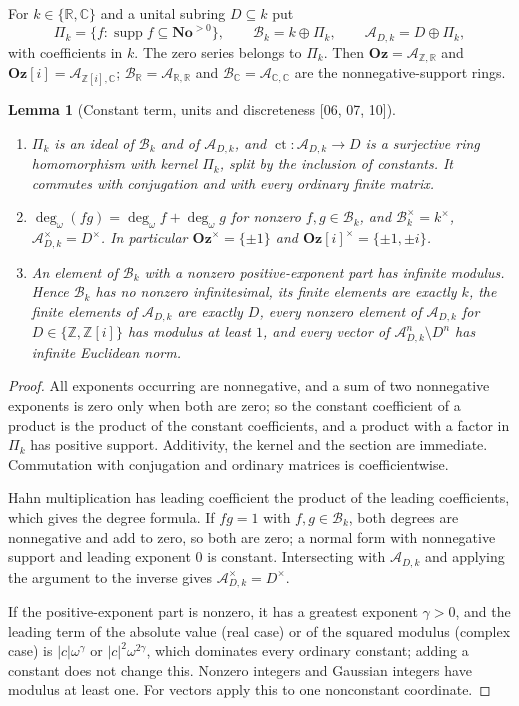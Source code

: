 \documentclass[11pt,oneside]{article}
\numberwithin{equation}{section}
\newtheorem{lemma}[lemma]{Lemma}
\theoremstyle{definition}
\theoremstyle{remark}
\newcommand{\No}{\mathbf{No}}
\newcommand{\Oz}{\mathbf{Oz}}
\newcommand{\GOz}{\mathbf{Oz}[i]}
\newcommand{\Z}{\mathbb Z}
\newcommand{\R}{\mathbb R}
\newcommand{\C}{\mathbb C}
\newcommand{\A}{\mathcal A}
\newcommand{\Bk}{\mathcal B_k}
\newcommand{\BR}{\mathcal B_{\R}}
\newcommand{\BC}{\mathcal B_{\C}}
\newcommand{\ct}{\operatorname{ct}}
\newcommand{\supp}{\operatorname{supp}}
\newcommand{\ddeg}{\operatorname{deg}_{\omega}}
\newcommand{\src}[1]{\textup{\textsf{\small[#1]}}}
\begin{document}
For $k\in\{\R,\C\}$ and a unital subring $D\subseteq k$ put
\begin{equation}\label{ogl:eq:rings}
 \Pi_k=\{f:\supp f\subseteq\No^{>0}\},\qquad
 \Bk=k\oplus\Pi_k,\qquad
 \A_{D,k}=D\oplus\Pi_k,
\end{equation}
with coefficients in $k$. The zero series belongs to $\Pi_k$. Then
$\Oz=\A_{\Z,\R}$ and $\GOz=\A_{\Z[i],\C}$; $\BR=\A_{\R,\R}$ and $\BC=\A_{\C,\C}$
are the nonnegative-support rings.

\begin{lemma}[Constant term, units and discreteness \src{06, 07, 10}]\label{ogl:lem:units}
\leavevmode
\begin{enumerate}
\item $\Pi_k$ is an ideal of $\Bk$ and of $\A_{D,k}$, and
$\ct:\A_{D,k}\to D$ is a surjective ring homomorphism with kernel $\Pi_k$,
split by the inclusion of constants. It commutes with conjugation and with
every ordinary finite matrix.
\item $\ddeg(fg)=\ddeg f+\ddeg g$ for nonzero $f,g\in\Bk$, and
$\Bk^\times=k^\times$, $\A_{D,k}^\times=D^\times$. In particular
$\Oz^\times=\{\pm1\}$ and $\GOz^\times=\{\pm1,\pm i\}$.
\item An element of $\Bk$ with a nonzero positive-exponent part has infinite
modulus. Hence $\Bk$ has no nonzero infinitesimal, its finite elements are
exactly $k$, the finite elements of $\A_{D,k}$ are exactly $D$, every nonzero
element of $\A_{D,k}$ for $D\in\{\Z,\Z[i]\}$ has modulus at least $1$, and
every vector of $\A_{D,k}^n\setminus D^n$ has infinite Euclidean norm.
\end{enumerate}
\end{lemma}
\begin{proof}
All exponents occurring are nonnegative, and a sum of two nonnegative
exponents is zero only when both are zero; so the constant coefficient of a
product is the product of the constant coefficients, and a product with a
factor in $\Pi_k$ has positive support. Additivity, the kernel and the section
are immediate. Commutation with conjugation and ordinary matrices is
coefficientwise.

Hahn multiplication has leading coefficient the product of the leading
coefficients, which gives the degree formula. If $fg=1$ with $f,g\in\Bk$,
both degrees are nonnegative and add to zero, so both are zero; a normal form
with nonnegative support and leading exponent $0$ is constant. Intersecting
with $\A_{D,k}$ and applying the argument to the inverse gives
$\A_{D,k}^\times=D^\times$.

If the positive-exponent part is nonzero, it has a greatest exponent
$\gamma>0$, and the leading term of the absolute value (real case) or of the
squared modulus (complex case) is $|c|\omega^\gamma$ or $|c|^2\omega^{2\gamma}$,
which dominates every ordinary constant; adding a constant does not change
this. Nonzero integers and Gaussian integers have modulus at least one. For
vectors apply this to one nonconstant coordinate.
\end{proof}
\end{document}
